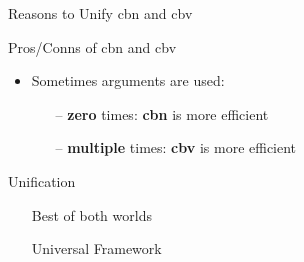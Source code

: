 \documentclass{beamer}
\theoremstyle{definition}
\begin{document}
  \begin{frame}{Reasons to Unify \textsf{cbn} and \textsf{cbv}}
    \begin{block}{Pros/Conns of \textsf{cbn} and \textsf{cbv}}
      \begin{itemize}
        \item Sometimes arguments are used: 
        \begin{itemize}
          \item[--] \textbf{zero} times: \textbf{cbn} is more efficient
          \item[--] \textbf{multiple} times: \textbf{cbv} is more efficient
        \end{itemize}
        \pause
      \end{itemize}
    \end{block}

    \pause

    \begin{block}{Unification}
      \begin{itemize}
        \item[\textbullet] Best of both worlds
        \item[\textbullet] Universal Framework 
      \end{itemize}
    \end{block}


    \end{frame}
\end{document}
